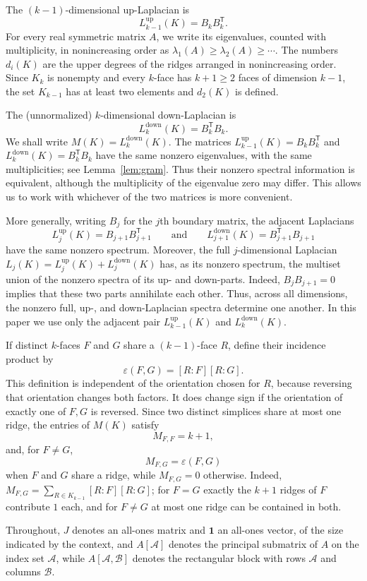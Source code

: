 \documentclass[11pt,reqno]{amsart}
\numberwithin{equation}{section}
\theoremstyle{plain}
\theoremstyle{definition}
\newcommand{\Lup}{L^{\mathrm{up}}}
\newcommand{\Ldown}{L^{\mathrm{down}}}
\newcommand{\eps}{\varepsilon}
\newcommand{\ones}{\mathbf{1}}
\newcommand{\T}{\mathsf{T}}
\newcommand{\Aset}{\mathcal A}
\newcommand{\Bset}{\mathcal B}
\begin{document}
The $(k-1)$-dimensional up-Laplacian is
\[
  \Lup_{k-1}(K)=B_k B_k^{\T} .
\]
For every real symmetric matrix $A$, we write its eigenvalues, counted with multiplicity, in
nonincreasing order as $\lambda_1(A)\ge\lambda_2(A)\ge\cdots$. The numbers $d_i(K)$ are the upper degrees
of the ridges arranged in nonincreasing order. Since $K_k$ is
nonempty and every $k$-face has $k+1\ge2$ faces of dimension $k-1$, the set $K_{k-1}$ has at
least two elements and $d_2(K)$ is defined.

The (unnormalized) $k$-dimensional down-Laplacian is
\[
  \Ldown_k(K)=B_k^{\T}B_k .
\]
We shall write $M(K)=\Ldown_k(K)$. The matrices
$\Lup_{k-1}(K)=B_k B_k^{\T}$ and $\Ldown_k(K)=B_k^{\T}B_k$ have the same nonzero eigenvalues,
with the same multiplicities; see Lemma~\ref{lem:gram}. Thus their nonzero spectral information
is equivalent, although the multiplicity of the eigenvalue zero may differ. This allows us to
work with whichever of the two matrices is more convenient.

More generally, writing $B_j$ for the $j$th boundary matrix, the adjacent Laplacians
\[
  \Lup_j(K)=B_{j+1}B_{j+1}^{\T}
  \qquad\text{and}\qquad
  \Ldown_{j+1}(K)=B_{j+1}^{\T}B_{j+1}
\]
have the same nonzero spectrum. Moreover, the full $j$-dimensional Laplacian
$L_j(K)=\Lup_j(K)+\Ldown_j(K)$ has, as its nonzero spectrum, the multiset union of the
nonzero spectra of its up- and down-parts. Indeed, $B_jB_{j+1}=0$ implies that these two parts
annihilate each other. Thus, across all dimensions, the nonzero full, up-, and down-Laplacian
spectra determine one another. In this paper we use only the adjacent pair
$\Lup_{k-1}(K)$ and $\Ldown_k(K)$.

If distinct $k$-faces $F$ and $G$ share a $(k-1)$-face $R$, define their incidence product by
\begin{equation}\label{eq:epsdef}
  \eps(F,G)=[R:F][R:G] .
\end{equation}
This definition is independent of the orientation chosen for $R$, because reversing that
orientation changes both factors. It does change sign if the orientation of exactly one of
$F,G$ is reversed. Since two distinct simplices share at most one ridge, the entries of $M(K)$
satisfy
\[
  M_{F,F}=k+1 ,
\]
and, for $F\ne G$,
\[
  M_{F,G}=\eps(F,G)
\]
when $F$ and $G$ share a ridge, while $M_{F,G}=0$ otherwise. Indeed,
$M_{F,G}=\sum_{R\in K_{k-1}}[R:F][R:G]$; for $F=G$ exactly the $k+1$ ridges of $F$ contribute
$1$ each, and for $F\ne G$ at most one ridge can be contained in both.

Throughout, $J$ denotes an all-ones matrix and $\ones$ an all-ones vector, of the size
indicated by the context, and $A[\Aset]$ denotes the principal submatrix of $A$ on the index
set $\Aset$, while $A[\Aset,\Bset]$ denotes the rectangular block with rows $\Aset$ and columns
$\Bset$.
\end{document}
